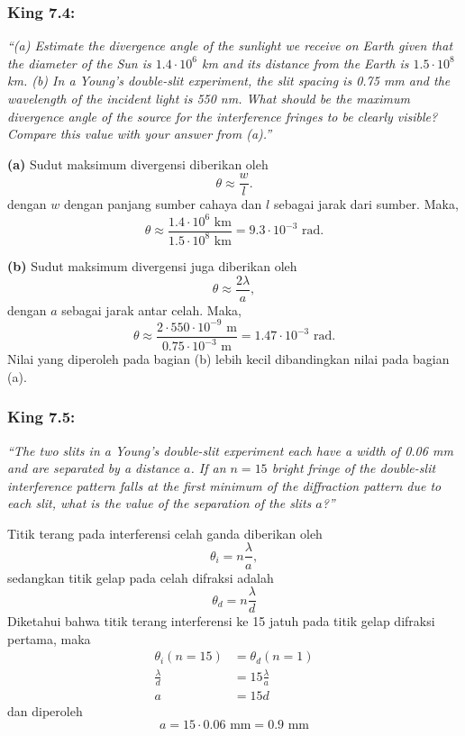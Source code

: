 \documentclass[../../../main.tex]{subfiles}
\begin{document}
\subsubsection*{King 7.4:}  \emph{\enquote{(a) Estimate the divergence angle of the sunlight we receive on Earth given that the diameter of the Sun is $1.4 \cdot10^6$ km and its distance from the Earth is $1.5 \cdot 10^8$ km. (b) In a Young’s double-slit experiment, the slit spacing is 0.75 mm and the wavelength of the incident light is 550 nm. What should be the maximum divergence angle of the source for the interference fringes to be clearly visible? Compare this value with your answer from (a).}}

\textbf{(a)} Sudut maksimum divergensi diberikan oleh 
\begin{equation*}
  \theta\approx\frac{w}{l}.
\end{equation*}
dengan $w$ dengan panjang sumber cahaya dan $l$ sebagai jarak dari sumber. Maka,
\begin{equation*}
  \theta\approx\frac{1.4 \cdot10^6 \text{ km}}{1.5 \cdot 10^8\text{ km}}=\boxed{9.3\cdot10^{-3}\text{ rad.}}
\end{equation*}

\textbf{(b)} Sudut maksimum divergensi juga diberikan oleh
\begin{equation*}
  \theta\approx\frac{2\lambda}{a},
\end{equation*}
dengan $a$ sebagai jarak antar celah. Maka,
\begin{equation*}
  \theta\approx\frac{2\cdot 550\cdot10^{-9} \text{ m}}{0.75\cdot10^{-3} \text{ m}}=\boxed{1.47\cdot10^{-3}\text{ rad}.}
\end{equation*}
Nilai yang diperoleh pada bagian (b) lebih kecil dibandingkan nilai pada bagian (a).

\subsubsection*{King 7.5:} \emph{\enquote{The two slits in a Young’s double-slit experiment each have a width of 0.06 mm and are separated by a distance $a$. If an $n = 15$ bright fringe of the double-slit interference pattern falls at the ﬁrst minimum of the diffraction pattern due to each slit, what is the value of the separation of the slits $a$?}}

Titik terang pada interferensi celah ganda diberikan oleh 
\begin{equation*}
  \theta_i=n\frac{\lambda}{a},
\end{equation*}
sedangkan titik gelap pada celah difraksi adalah
\begin{equation*}
  \theta_d=n\frac{\lambda}{d}
\end{equation*}
Diketahui bahwa titik terang interferensi ke 15 jatuh pada titik gelap difraksi pertama, maka 
\begin{align*}
  \theta_i(n=15)&=\theta_d(n=1)\\
  \frac{\lambda}{d}&=15\frac{\lambda}{a}\\
  a&=15d
\end{align*}
dan diperoleh
\begin{equation*}
  a=15\cdot0.06 \text{ mm}=\boxed{0.9 \text{ mm}}
\end{equation*}
\end{document}
